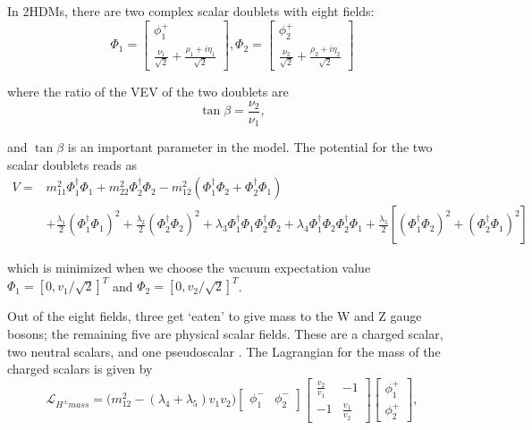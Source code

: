 In 2HDMs, there are two complex scalar doublets with eight fields:
\begin{equation}
	\Phi_1 = \begin{bmatrix} \phi_1^+ \\ \frac{\nu_1}{\sqrt{2}} + \frac{\rho_1+i\eta_1}{\sqrt{2}}  \end{bmatrix} , 
    \Phi_2 = \begin{bmatrix} \phi_2^+ \\ \frac{\nu_2}{\sqrt{2}} + \frac{\rho_2+i\eta_2}{\sqrt{2}}  \end{bmatrix}
\end{equation}

\noindent where the ratio of the VEV of the two doublets are
\begin{equation}
\tan \beta = \frac{\nu_2}{\nu_1},
\end{equation}

\noindent and $\tan \beta$  is an important parameter in the model. The potential for the two scalar doublets reads as
\begin{equation}
\begin{split}
V=& m_{11}^2 \Phi_1^\dagger \Phi_1 + m_{22}^2 \Phi_2^\dagger \Phi_2 - m_{12}^2 ( \Phi_1^\dagger \Phi_2+\Phi_2^\dagger \Phi_1) \\
&  +\frac{\lambda_1}{2}(\Phi_1^\dagger \Phi_1)^2 +\frac{\lambda_2}{2}(\Phi_2^\dagger \Phi_2)^2
+\lambda_3 \Phi_1^\dagger \Phi_1 \Phi_2^\dagger \Phi_2 +\lambda_4 \Phi_1^\dagger \Phi_2 \Phi_2^\dagger \Phi_1
+\frac{\lambda_5}{2}[ (\Phi_1^\dagger \Phi_2)^2 + (\Phi_2^\dagger \Phi_1)^2 ]
\end{split}
\end{equation}

\noindent which is minimized when we choose the vacuum expectation value $\Phi_1= [0,v_1/\sqrt{2}]^T$ and $\Phi_2= [0,v_2/\sqrt{2}]^T$.



\noindent Out of the eight fields, three get ‘eaten’ to give mass to the W and Z gauge bosons; the remaining five are physical scalar fields. These are a charged scalar, two neutral scalars, and one pseudoscalar \cite{BRANCO20121}. The Lagrangian for the mass of the charged scalars is given by
\begin{equation}
	\mathcal{L}_{H^{\pm} mass} = \big( m_{12}^2 -(\lambda_4+\lambda_5) v_1 v_2 \big) 
    \begin{bmatrix} \phi_1^- & \phi_2^-  \end{bmatrix}
    \begin{bmatrix} \frac{v_2}{v_1} & -1 \\ -1 & \frac{v_1}{v_2} \end{bmatrix}
    \begin{bmatrix} \phi_1^+ \\ \phi_2^+ \end{bmatrix} ,
\end{equation}

